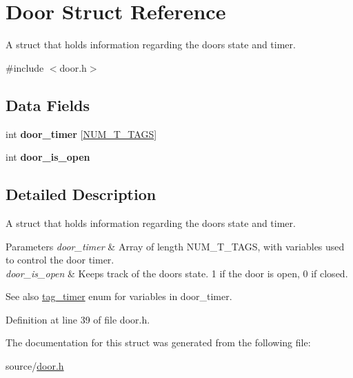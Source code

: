 \hypertarget{structDoor}{}\section{Door Struct Reference}
\label{structDoor}


A struct that holds information regarding the door\textquotesingle{}s state and timer.  




{\ttfamily \#include $<$door.\+h$>$}

\subsection*{Data Fields}
\begin{DoxyCompactItemize}
\item 
\mbox{\label{structDoor_aa5e2ba489f890ed656ac936513fd90fb}} 
int {\bfseries door\+\_\+timer} \mbox{[}\mbox{\hyperlink{door_8h_a4805ac658f5672fc7f938a3622962948a7314652df30c259bec1d360788aef62c}{N\+U\+M\+\_\+\+T\+\_\+\+T\+A\+GS}}\mbox{]}
\item 
\mbox{\label{structDoor_a7e103b2e2527ecdead0dfd1f07366de9}} 
int {\bfseries door\+\_\+is\+\_\+open}
\end{DoxyCompactItemize}


\subsection{Detailed Description}
A struct that holds information regarding the door\textquotesingle{}s state and timer. 


\begin{DoxyParams}{Parameters}
{\em door\+\_\+timer} & Array of length N\+U\+M\+\_\+\+T\+\_\+\+T\+A\+GS, with variables used to control the door timer. \\
\hline
{\em door\+\_\+is\+\_\+open} & Keeps track of the door\textquotesingle{}s state. 1 if the door is open, 0 if closed. \\
\hline
\end{DoxyParams}
\begin{DoxySeeAlso}{See also}
\mbox{\hyperlink{door_8h_a4805ac658f5672fc7f938a3622962948}{tag\+\_\+timer}} enum for variables in {\ttfamily door\+\_\+timer}. 
\end{DoxySeeAlso}


Definition at line 39 of file door.\+h.



The documentation for this struct was generated from the following file\+:\begin{DoxyCompactItemize}
\item 
source/\mbox{\hyperlink{door_8h}{door.\+h}}\end{DoxyCompactItemize}
